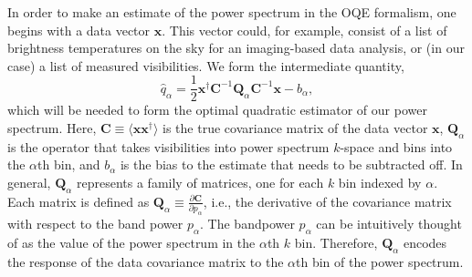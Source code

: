 \documentclass[twocolumn,numberedappendix]{emulateapj} \shorttitle{New Limits on the 21 cm Power Spectrum at $z=8.4$}
\newcommand{\x}{\mathbf{x}} \newcommand{\xhat}{\hat{\mathbf{x}}}
\begin{document}
In order to make an estimate of the power spectrum in the OQE formalism, one begins with a data
vector $\x$. This vector could, for example, consist of a list of brightness temperatures on the sky
for an imaging-based data analysis, or (in our case) a list of measured visibilities. We form
the intermediate quantity,
\begin{equation}
\label{eqn:qalpha}
   \hat{q}_{\alpha} = \frac{1}{2}\x^\dagger\mathbf{C}^{-1}\mathbf{Q}_{\alpha}\mathbf{C}^{-1}\x - b_{\alpha},
\end{equation}
which will be needed to form the optimal quadratic estimator of our power spectrum.
Here, $\mathbf{C} \equiv \langle \x \x^\dagger \rangle$ is the true covariance matrix of the data vector $\x$, 
$\mathbf{Q}_{\alpha}$ is the operator that takes visibilities into power spectrum
$k$-space and bins into the ${\alpha}$th bin, and $b_{\alpha}$ is the bias to
the estimate that needs to be subtracted off. In general, $\mathbf{Q}_{\alpha}$
represents a family of matrices, one for each $k$ bin indexed by $\alpha$. Each matrix
is defined as
$\mathbf{Q}_{\alpha} \equiv
\frac{\partial{\mathbf{C}}}{\partial p_{\alpha}}$, i.e., the derivative of the covariance
matrix with respect to the band power $p_\alpha$. 
The bandpower $p_\alpha$
can be intuitively thought of as the value of the power spectrum in the $\alpha$th
$k$ bin.  Therefore, $\mathbf{Q}_{\alpha}$ encodes the response of the data
covariance matrix to the $\alpha$th bin of the power spectrum. 
\end{document}
